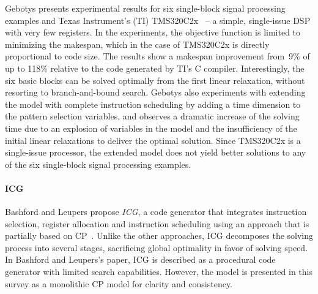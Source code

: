 \documentclass[acmsmall,authorversion,nonacm]{acmart}
\begin{document}
Gebotys presents experimental results for six single-block signal
processing examples and Texas Instrument's (TI) TMS320C2x~\cite{C2x}
-- a simple, single-issue DSP with very few registers.
In the experiments, the objective function is limited to minimizing
the makespan, which in the case of TMS320C2x is directly proportional
to code size.
The results show a makespan improvement from~9\% of up to 118\%
relative to the code generated by TI's C compiler.
Interestingly, the six basic blocks can be solved optimally from the
first linear relaxation, without resorting to branch-and-bound search.
Gebotys also experiments with extending the model with complete
instruction scheduling by adding a time dimension to the pattern
selection variables, and observes a dramatic increase of the solving
time due to an explosion of variables in the model and the
insufficiency of the initial linear relaxations to deliver the optimal
solution.
Since TMS320C2x is a single-issue processor, the extended model does
not yield better solutions to any of the six single-block signal
processing examples.

\paragraph{ICG}

Bashford and Leupers propose \emph{ICG}, a code generator that
integrates instruction selection, register allocation and instruction
scheduling using an approach that is partially based on
CP~\cite{Bashford1999}.
Unlike the other approaches, ICG decomposes the solving process into
several stages, sacrificing global optimality in favor of solving
speed.
In Bashford and Leupers's paper, ICG is described as a procedural code
generator with limited search capabilities.
However, the model is presented in this survey as a monolithic CP
model for clarity and consistency.
\end{document}
